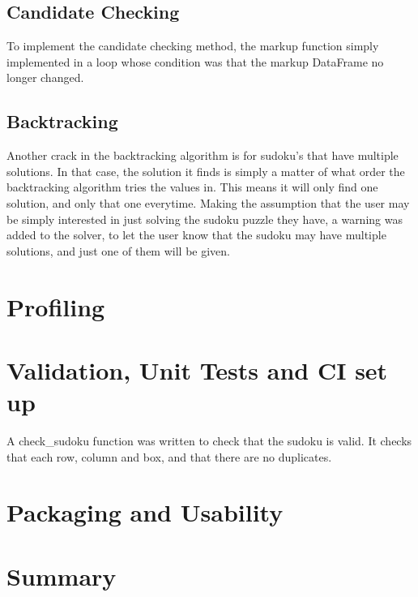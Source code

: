 \documentclass[12pt]{report} %
\begin{document}
\subsection{Candidate Checking}
To implement the candidate checking method, the markup function simply implemented in a loop whose condition was that the markup DataFrame no longer changed.

\subsection{Backtracking}

Another crack in the backtracking algorithm is for sudoku's that have multiple solutions. In that case, the solution it finds is simply a matter of what order the backtracking algorithm tries the values in. This means it will only find one solution, and only that one everytime. Making the assumption that the user may be simply interested in just solving the sudoku puzzle they have, a warning was added to the solver, to let the user know that the sudoku may have multiple solutions, and just one of them will be given.

\section{Profiling}

\section{Validation, Unit Tests and CI set up}

A check\_sudoku function was written to check that the sudoku is valid. It checks that each row, column and box, and that there are no duplicates.

\section{Packaging and Usability}

\section{Summary}



\end{document}
